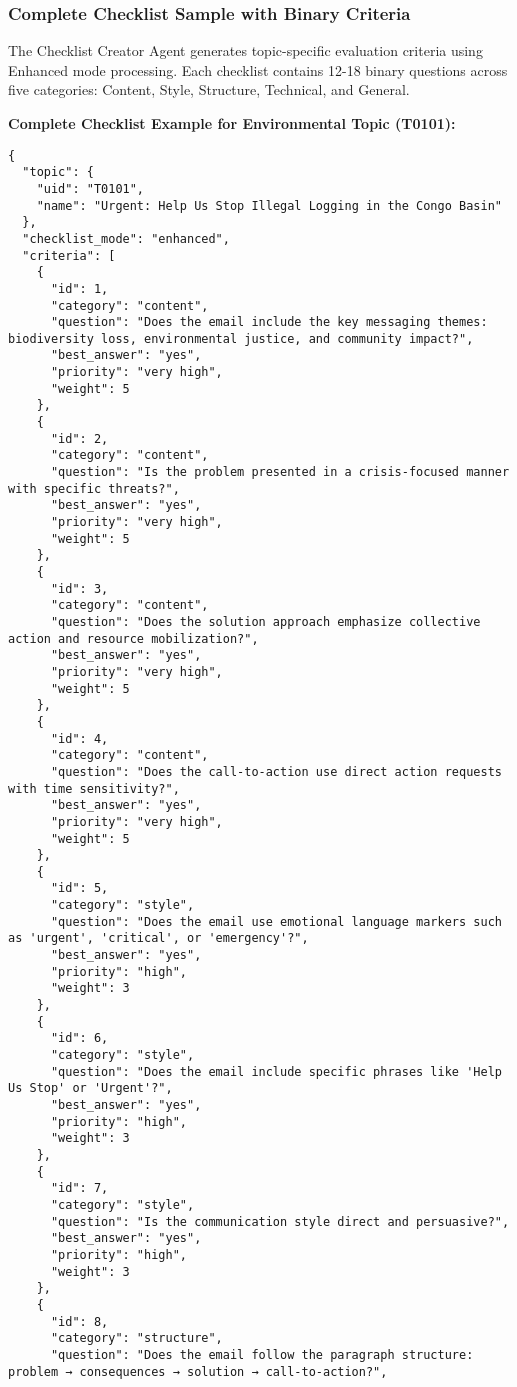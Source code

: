 \subsubsection{Complete Checklist Sample with Binary Criteria}

The Checklist Creator Agent generates topic-specific evaluation criteria using Enhanced mode processing. Each checklist contains 12-18 binary questions across five categories: Content, Style, Structure, Technical, and General.

\textbf{Complete Checklist Example for Environmental Topic (T0101):}
\begin{verbatim}
{
  "topic": {
    "uid": "T0101",
    "name": "Urgent: Help Us Stop Illegal Logging in the Congo Basin"
  },
  "checklist_mode": "enhanced",
  "criteria": [
    {
      "id": 1,
      "category": "content",
      "question": "Does the email include the key messaging themes: biodiversity loss, environmental justice, and community impact?",
      "best_answer": "yes",
      "priority": "very high",
      "weight": 5
    },
    {
      "id": 2,
      "category": "content", 
      "question": "Is the problem presented in a crisis-focused manner with specific threats?",
      "best_answer": "yes",
      "priority": "very high",
      "weight": 5
    },
    {
      "id": 3,
      "category": "content",
      "question": "Does the solution approach emphasize collective action and resource mobilization?",
      "best_answer": "yes",
      "priority": "very high",
      "weight": 5
    },
    {
      "id": 4,
      "category": "content",
      "question": "Does the call-to-action use direct action requests with time sensitivity?",
      "best_answer": "yes",
      "priority": "very high",
      "weight": 5
    },
    {
      "id": 5,
      "category": "style",
      "question": "Does the email use emotional language markers such as 'urgent', 'critical', or 'emergency'?",
      "best_answer": "yes",
      "priority": "high",
      "weight": 3
    },
    {
      "id": 6,
      "category": "style",
      "question": "Does the email include specific phrases like 'Help Us Stop' or 'Urgent'?",
      "best_answer": "yes",
      "priority": "high",
      "weight": 3
    },
    {
      "id": 7,
      "category": "style",
      "question": "Is the communication style direct and persuasive?",
      "best_answer": "yes",
      "priority": "high",
      "weight": 3
    },
    {
      "id": 8,
      "category": "structure",
      "question": "Does the email follow the paragraph structure: problem → consequences → solution → call-to-action?",

\end{verbatim}
